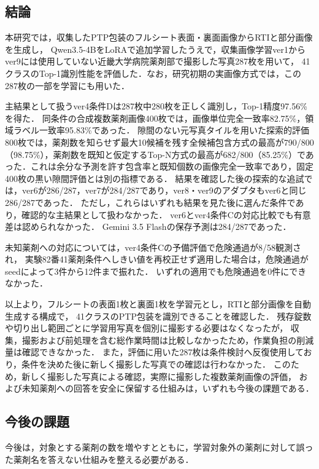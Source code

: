 \documentclass[uplatex,dvipdfmx]{jsarticle}
\begin{document}
\subsection{結論}

本研究では，収集したPTP包装のフルシート表面・裏面画像からRTIと部分画像を生成し，
Qwen3.5-4BをLoRAで追加学習したうえで，収集画像学習ver1からver9には使用していない近畿大学病院薬剤部で撮影した写真287枚を用いて，
41クラスのTop-1識別性能を評価した．なお，研究初期の実画像方式では，この287枚の一部を学習にも用いた．

主結果として扱うver4条件Dは287枚中280枚を正しく識別し，Top-1精度97.56\%を得た．
同条件の合成複数薬剤画像400枚では，画像単位完全一致率82.75\%，領域ラベル一致率95.83\%であった．
隙間のない元写真タイルを用いた探索的評価800枚では，薬剤数を知らせず最大10候補を残す全候補包含方式の最高が790/800（98.75\%），薬剤数を既知と仮定するTop-N方式の最高が682/800（85.25\%）であった．これは余分な予測を許す包含率と既知個数の画像完全一致率であり，固定400枚の黒い隙間評価とは別の指標である．
結果を確認した後の探索的な追試では，ver6が286/287，ver7が284/287であり，ver8・ver9のアダプタもver6と同じ286/287であった．
ただし，これらはいずれも結果を見た後に選んだ条件であり，確認的な主結果として扱わなかった．
ver6とver4条件Cの対応比較でも有意差は認められなかった．
Gemini 3.5 Flashの保存予測は284/287であった．

未知薬剤への対応については，ver4条件Cの予備評価で危険通過が8/58観測され，
実験82番41薬剤条件へしきい値を再校正せず適用した場合は，危険通過がseedによって3件から12件まで振れた．
いずれの適用でも危険通過を0件にできなかった．

以上より，フルシートの表面1枚と裏面1枚を学習元とし，RTIと部分画像を自動生成する構成で，
41クラスのPTP包装を識別できることを確認した．
残存錠数や切り出し範囲ごとに学習用写真を個別に撮影する必要はなくなったが，
収集，撮影および前処理を含む総作業時間は比較しなかったため，作業負担の削減量は確認できなかった．
また，評価に用いた287枚は条件検討へ反復使用しており，条件を決めた後に新しく撮影した写真での確認は行わなかった．
このため，新しく撮影した写真による確認，実際に撮影した複数薬剤画像の評価，
および未知薬剤への回答を安全に保留する仕組みは，いずれも今後の課題である．

\subsection{今後の課題}

今後は，対象とする薬剤の数を増やすとともに，学習対象外の薬剤に対して誤った薬剤名を答えない仕組みを整える必要がある．
\end{document}

